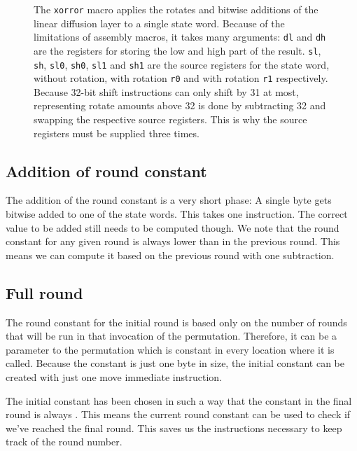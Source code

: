 \begin{figure}[p]


\caption{The \texttt{xorror} macro applies the rotates and bitwise additions of
the linear diffusion layer to a single state word. Because of the limitations of
assembly macros, it takes many arguments:
\texttt{dl} and \texttt{dh} are the registers for storing the low and high part
of the result. \texttt{sl}, \texttt{sh}, \texttt{sl0}, \texttt{sh0},
\texttt{sl1} and \texttt{sh1} are the source registers for the state word,
without rotation, with rotation \texttt{r0} and with rotation \texttt{r1}
respectively. Because 32-bit shift instructions can only shift by 31 at most,
representing rotate amounts above 32 is done by subtracting 32 and swapping the
respective source registers. This is why the source registers must be supplied
three times.}

\label{xorror}
\end{figure}

\subsection{Addition of round constant}

The addition of the round constant is a very short phase: A single byte gets
bitwise added to one of the state words. This takes one instruction. The correct
value to be added still needs to be computed though. We note that the round
constant for any given round is always  lower than in the previous round.
This means we can compute it based on the previous round with one subtraction.

\subsection{Full round}

The round constant for the initial round is based only on the number of rounds
that will be run in that invocation of the permutation. Therefore, it can be a
parameter to the permutation which is constant in every location where it is
called. Because the constant is just one byte in size, the initial constant can
be created with just one move immediate instruction.

The initial constant has been chosen in such a way that the constant in the
final round is always . This means the current round constant can be
used to check if we've reached the final round. This saves us the instructions
necessary to keep track of the round number.

